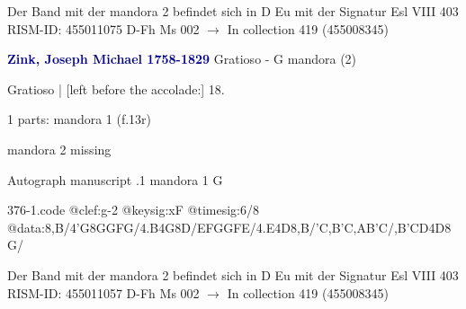 \documentclass[twocolumn]{book}
\begin{document}
\newline Der Band mit der mandora 2 befindet sich in D Eu mit der Signatur Esl VIII 403
\newline RISM-ID: 455011075
\newline D-Fh  Ms 002
\newline $\rightarrow$ In collection 419 (455008345)
      
\newline \par \vspace{7pt} \textcolor{darkblue}{\textbf{Zink, Joseph Michael  1758-1829}}
\newline Gratioso - G
\newline mandora (2)
\newline \begin{itshape}[f.13r, at left:] Gratioso | [left before the accolade:] 18.\end{itshape} 
\newline \textcolor{darkblue}{}  1 parts: mandora 1  (f.13r)
\newline \begin{small} mandora 2 missing\end{small} 
\newline Autograph manuscript
.1  mandora 1  G  
\begin{filecontents*}{376-1.code}
@clef:g-2
@keysig:xF
@timesig:6/8
@data:8,B/4'G8GGFG/4.B4G8D/{EF}GGFE/4.E4D8,B/'C,B'C,AB'C/{,B'C}D4D8G/
\end{filecontents*}
\newline
%

\newline Der Band mit der mandora 2 befindet sich in D Eu mit der Signatur Esl VIII 403
\newline RISM-ID: 455011057
\newline D-Fh  Ms 002
\newline $\rightarrow$ In collection 419 (455008345)
      
\end{document}
